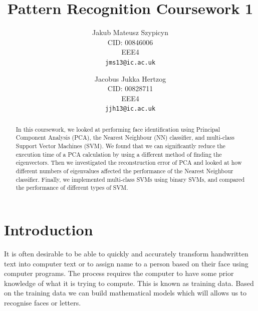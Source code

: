\documentclass[10pt,twocolumn,letterpaper]{article}
\begin{document}
\title{Pattern Recognition Coursework 1}

\author{Jakub Mateusz Szypicyn\\
CID: 00846006\\
EEE4\\
{\tt\small jms13@ic.ac.uk}
\and
Jacobus Jukka Hertzog\\
CID: 00828711\\
EEE4\\
{\tt\small jjh13@ic.ac.uk}
}

\maketitle

\begin{abstract}
\vspace{-4mm}
In this coursework, we looked at performing face identification using Principal Component Analysis (PCA), the Nearest Neighbour (NN) classifier, and multi-class Support Vector Machines (SVM). We found that we can significantly reduce the execution time of a  PCA calculation by using a different method of finding the eigenvectors. Then we investigated the reconstruction error of PCA and looked at how different numbers of eigenvalues affected the performance of the Nearest Neighbour classifier. Finally, we implemented multi-class SVMs using binary SVMs, and compared the performance of different types of SVM.
\end{abstract}
\vspace{-5mm}
\section{Introduction}

It is often desirable to be able to quickly and accurately transform handwritten text into computer text or to assign name to a person based on their face using computer programs. The process requires the computer to have some prior knowledge of what it is trying to compute. This is known as training data. Based on the training data we can build mathematical models which will allows us to recognise faces or letters.
\end{document}
